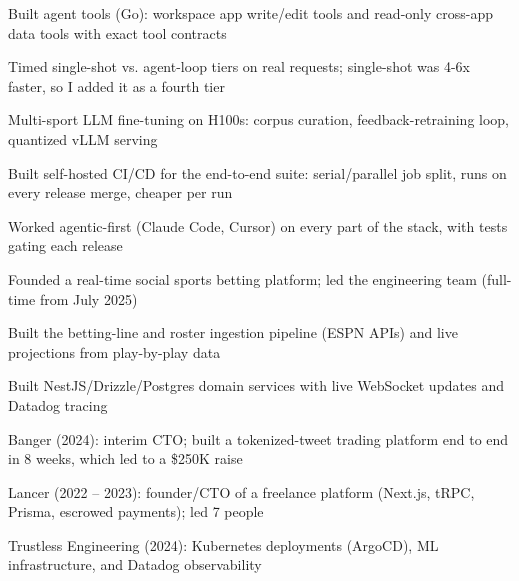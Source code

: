 \documentclass[print]{jack-resume}
\begin{document}
\begin{tightemize}
    \item Built agent tools (Go): workspace app write/edit tools and read-only cross-app data tools with exact tool contracts
    \item Timed single-shot vs. agent-loop tiers on real requests; single-shot was 4-6x faster, so I added it as a fourth tier
    \item Multi-sport LLM fine-tuning on H100s: corpus curation, feedback-retraining loop, quantized vLLM serving
    \item Built self-hosted CI/CD for the end-to-end suite: serial/parallel job split, runs on every release merge, cheaper per run
    \item Worked agentic-first (Claude Code, Cursor) on every part of the stack, with tests gating each release
\end{tightemize}
\sectionsep

\begin{tightemize}
    \item Founded a real-time social sports betting platform; led the engineering team (full-time from July 2025)
    \item Built the betting-line and roster ingestion pipeline (ESPN APIs) and live projections from play-by-play data
    \item Built NestJS/Drizzle/Postgres domain services with live WebSocket updates and Datadog tracing
\end{tightemize}
\sectionsep

\begin{tightemize}
    \item Banger (2024): interim CTO; built a tokenized-tweet trading platform end to end in 8 weeks, which led to a \$250K raise
    \item Lancer (2022 -- 2023): founder/CTO of a freelance platform (Next.js, tRPC, Prisma, escrowed payments); led 7 people
    \item Trustless Engineering (2024): Kubernetes deployments (ArgoCD), ML infrastructure, and Datadog observability
\end{tightemize}
\sectionsep
\end{document}
